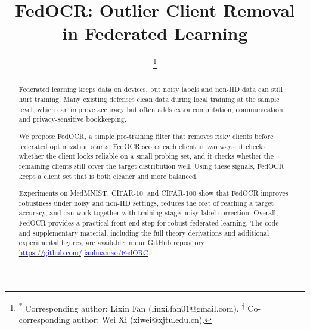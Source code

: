 ﻿\documentclass[conference]{IEEEtran}
\theoremstyle{definition}
\theoremstyle{remark}
\begin{document}
\title{FedOCR: Outlier Client Removal in Federated Learning}

\author{
\thanks{\textsuperscript{*} Corresponding author: Lixin Fan (linxi.fan01@gmail.com). \textsuperscript{$\dag$} Co-corresponding author: Wei Xi (xiwei@xjtu.edu.cn).}
}

\maketitle

\begin{abstract}
Federated learning keeps data on devices, but noisy labels and non-IID data can still hurt training. Many existing defenses clean data during local training at the sample level, which can improve accuracy but often adds extra computation, communication, and privacy-sensitive bookkeeping.

We propose FedOCR, a simple pre-training filter that removes risky clients before federated optimization starts. FedOCR scores each client in two ways: it checks whether the client looks reliable on a small probing set, and it checks whether the remaining clients still cover the target distribution well. Using these signals, FedOCR keeps a client set that is both cleaner and more balanced.

Experiments on MedMNIST, CIFAR-10, and CIFAR-100 show that FedOCR improves robustness under noisy and non-IID settings, reduces the cost of reaching a target accuracy, and can work together with training-stage noisy-label correction. Overall, FedOCR provides a practical front-end step for robust federated learning. The code and supplementary material, including the full theory derivations and additional experimental figures, are available in our GitHub repository: \href{https://github.com/jianhuamao/FedORC}{\textcolor{blue}{https://github.com/jianhuamao/FedORC}}.

\end{abstract}
\end{document}
